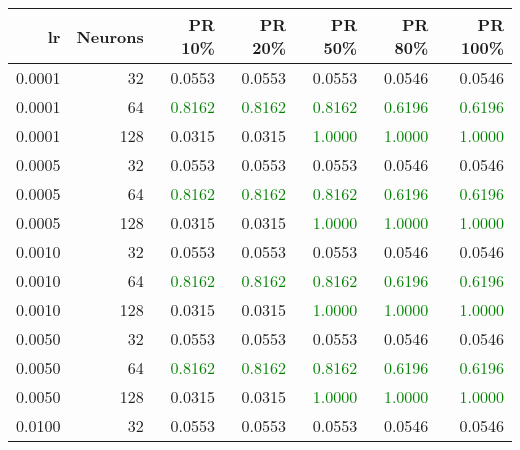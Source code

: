 \begin{tabular}{rrrrrrr}
\toprule
lr & Neurons & PR 10\% & PR 20\% & PR 50\% & PR 80\% & PR 100\% \\
\midrule
0.0001 & 32 & \textcolor{blu} {0.0553} & \textcolor{blu} {0.0553} & \textcolor{blu} {0.0553} & \textcolor{blu} {0.0546} & \textcolor{blu} {0.0546} \\
0.0001 & 64 & \textcolor{green} {0.8162} & \textcolor{green} {0.8162} & \textcolor{green} {0.8162} & \textcolor{green} {0.6196} & \textcolor{green} {0.6196} \\
0.0001 & 128 & \textcolor{blu} {0.0315} & \textcolor{blu} {0.0315} & \textcolor{green} {1.0000} & \textcolor{green} {1.0000} & \textcolor{green} {1.0000} \\
0.0005 & 32 & \textcolor{blu} {0.0553} & \textcolor{blu} {0.0553} & \textcolor{blu} {0.0553} & \textcolor{blu} {0.0546} & \textcolor{blu} {0.0546} \\
0.0005 & 64 & \textcolor{green} {0.8162} & \textcolor{green} {0.8162} & \textcolor{green} {0.8162} & \textcolor{green} {0.6196} & \textcolor{green} {0.6196} \\
0.0005 & 128 & \textcolor{blu} {0.0315} & \textcolor{blu} {0.0315} & \textcolor{green} {1.0000} & \textcolor{green} {1.0000} & \textcolor{green} {1.0000} \\
0.0010 & 32 & \textcolor{blu} {0.0553} & \textcolor{blu} {0.0553} & \textcolor{blu} {0.0553} & \textcolor{blu} {0.0546} & \textcolor{blu} {0.0546} \\
0.0010 & 64 & \textcolor{green} {0.8162} & \textcolor{green} {0.8162} & \textcolor{green} {0.8162} & \textcolor{green} {0.6196} & \textcolor{green} {0.6196} \\
0.0010 & 128 & \textcolor{blu} {0.0315} & \textcolor{blu} {0.0315} & \textcolor{green} {1.0000} & \textcolor{green} {1.0000} & \textcolor{green} {1.0000} \\
0.0050 & 32 & \textcolor{blu} {0.0553} & \textcolor{blu} {0.0553} & \textcolor{blu} {0.0553} & \textcolor{blu} {0.0546} & \textcolor{blu} {0.0546} \\
0.0050 & 64 & \textcolor{green} {0.8162} & \textcolor{green} {0.8162} & \textcolor{green} {0.8162} & \textcolor{green} {0.6196} & \textcolor{green} {0.6196} \\
0.0050 & 128 & \textcolor{blu} {0.0315} & \textcolor{blu} {0.0315} & \textcolor{green} {1.0000} & \textcolor{green} {1.0000} & \textcolor{green} {1.0000} \\
0.0100 & 32 & \textcolor{blu} {0.0553} & \textcolor{blu} {0.0553} & \textcolor{blu} {0.0553} & \textcolor{blu} {0.0546} & \textcolor{blu} {0.0546} \\

\end{tabular}
